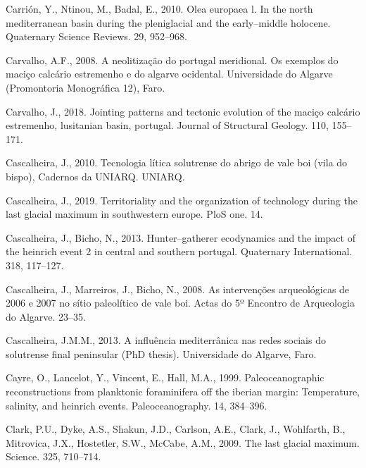 \documentclass[12pt,twoside]{reedthesis}
\begin{document}
\leavevmode\hypertarget{ref-carrion2010}{}%
Carrión, Y., Ntinou, M., Badal, E., 2010. Olea europaea l. In the north mediterranean basin during the pleniglacial and the early--middle holocene. Quaternary Science Reviews. 29, 952--968.

\leavevmode\hypertarget{ref-carvalho2008}{}%
Carvalho, A.F., 2008. A neolitização do portugal meridional. Os exemplos do maciço calcário estremenho e do algarve ocidental. Universidade do Algarve (Promontoria Monográfica 12), Faro.

\leavevmode\hypertarget{ref-carvalho2018}{}%
Carvalho, J., 2018. Jointing patterns and tectonic evolution of the maciço calcário estremenho, lusitanian basin, portugal. Journal of Structural Geology. 110, 155--171.

\leavevmode\hypertarget{ref-cascalheira2010}{}%
Cascalheira, J., 2010. Tecnologia lítica solutrense do abrigo de vale boi (vila do bispo), Cadernos da UNIARQ. UNIARQ.

\leavevmode\hypertarget{ref-cascalheira2019}{}%
Cascalheira, J., 2019. Territoriality and the organization of technology during the last glacial maximum in southwestern europe. PloS one. 14.

\leavevmode\hypertarget{ref-cascalheiraandbicho2013}{}%
Cascalheira, J., Bicho, N., 2013. Hunter--gatherer ecodynamics and the impact of the heinrich event 2 in central and southern portugal. Quaternary International. 318, 117--127.

\leavevmode\hypertarget{ref-cascalheiraetal2008}{}%
Cascalheira, J., Marreiros, J., Bicho, N., 2008. As intervenções arqueológicas de 2006 e 2007 no sítio paleolítico de vale boi. Actas do 5º Encontro de Arqueologia do Algarve. 23--35.

\leavevmode\hypertarget{ref-cascalheira2013}{}%
Cascalheira, J.M.M., 2013. A influência mediterrânica nas redes sociais do solutrense final peninsular (PhD thesis). Universidade do Algarve, Faro.

\leavevmode\hypertarget{ref-cayre1999}{}%
Cayre, O., Lancelot, Y., Vincent, E., Hall, M.A., 1999. Paleoceanographic reconstructions from planktonic foraminifera off the iberian margin: Temperature, salinity, and heinrich events. Paleoceanography. 14, 384--396.

\leavevmode\hypertarget{ref-clark2009}{}%
Clark, P.U., Dyke, A.S., Shakun, J.D., Carlson, A.E., Clark, J., Wohlfarth, B., Mitrovica, J.X., Hostetler, S.W., McCabe, A.M., 2009. The last glacial maximum. Science. 325, 710--714.
\end{document}
